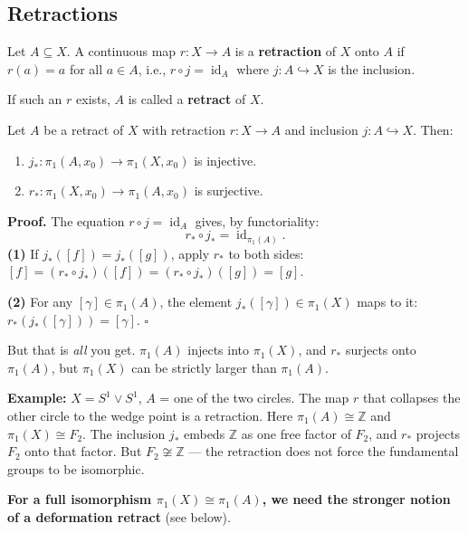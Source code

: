 \documentclass[11pt]{report}
\renewenvironment{proof}[1][Proof]{\noindent\textbf{#1.} }{\hfill$\square$\par\vspace{5pt}}
\begin{document}
\subsection{Retractions}

\begin{defbox}[Retraction]
Let $A \subseteq X$. A continuous map $r: X \to A$ is a \textbf{retraction} of $X$ onto $A$ if $r(a) = a$ for all $a \in A$, i.e., $r \circ j = \operatorname{id}_A$ where $j: A \hookrightarrow X$ is the inclusion.

If such an $r$ exists, $A$ is called a \textbf{retract} of $X$.
\end{defbox}

\begin{propbox}
Let $A$ be a retract of $X$ with retraction $r: X \to A$ and inclusion $j: A \hookrightarrow X$. Then:
\begin{enumerate}[nosep]
    \item $j_*: \pi_1(A, x_0) \to \pi_1(X, x_0)$ is injective.
    \item $r_*: \pi_1(X, x_0) \to \pi_1(A, x_0)$ is surjective.
\end{enumerate}
\end{propbox}

\begin{proof}
The equation $r \circ j = \operatorname{id}_A$ gives, by functoriality:
\[r_* \circ j_* = \operatorname{id}_{\pi_1(A)}.\]
\textbf{(1)} If $j_*([f]) = j_*([g])$, apply $r_*$ to both sides: $[f] = (r_* \circ j_*)([f]) = (r_* \circ j_*)([g]) = [g]$.

\textbf{(2)} For any $[\gamma] \in \pi_1(A)$, the element $j_*([\gamma]) \in \pi_1(X)$ maps to it: $r_*(j_*([\gamma])) = [\gamma]$.
\end{proof}

\begin{rembox}
But that is \emph{all} you get. $\pi_1(A)$ injects into $\pi_1(X)$, and $r_*$ surjects onto $\pi_1(A)$, but $\pi_1(X)$ can be strictly larger than $\pi_1(A)$.

\textbf{Example:} $X = S^1 \vee S^1$, $A$ = one of the two circles. The map $r$ that collapses the other circle to the wedge point is a retraction. Here $\pi_1(A) \cong \mathbb{Z}$ and $\pi_1(X) \cong F_2$. The inclusion $j_*$ embeds $\mathbb{Z}$ as one free factor of $F_2$, and $r_*$ projects $F_2$ onto that factor. But $F_2 \not\cong \mathbb{Z}$ --- the retraction does not force the fundamental groups to be isomorphic.

\textbf{For a full isomorphism $\pi_1(X) \cong \pi_1(A)$, we need the stronger notion of a deformation retract} (see below).
\end{rembox}
\end{document}
